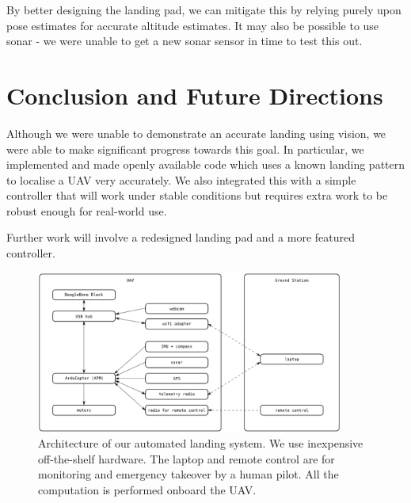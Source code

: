 \documentclass[10pt]{scrartcl} %
\begin{document}
By better designing the landing pad, we can mitigate this by relying purely
upon pose estimates for accurate altitude estimates. It may also be possible to
use sonar - we were unable to get a new sonar sensor in time to test this out.


\section{Conclusion and Future Directions}

Although we were unable to demonstrate an accurate landing using vision, we
were able to make significant progress towards this goal. In particular, we
implemented and made openly available code which uses a known landing pattern
to localise a UAV very accurately. We also integrated this with a simple
controller that will work under stable conditions but requires extra work to be
robust enough for real-world use.

Further work will involve a redesigned landing pad and a more featured controller.


\printbibliography


\clearpage

\begin{figure}[h!]
\centering
\includegraphics[width=0.9\textwidth]{images/architecture.png}
\caption{
    Architecture of our automated landing system. We use inexpensive
    off-the-shelf hardware. The laptop and remote control are for
    monitoring and emergency takeover by a human pilot. All the
    computation is performed onboard the UAV.
}
\label{fig:hardware-arch}
\end{figure}
\end{document}
